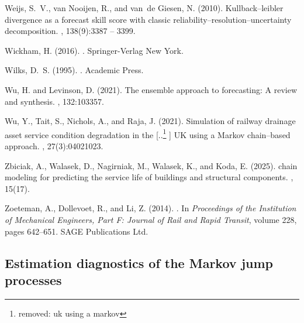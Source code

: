 \documentclass{article}
\providecommand{\DIFadd}[1]{{\protect\color{blue} \sf #1}} %
\providecommand{\DIFdel}[1]{{\protect\color{red} [..\footnote{removed: #1} ]}} %
\providecommand{\DIFaddbegin}{} %
\providecommand{\DIFaddend}{} %
\providecommand{\DIFdelbegin}{} %
\providecommand{\DIFdelend}{} %
\providecommand{\DIFaddFL}[1]{\DIFadd{#1}} %
\begin{document}
\begin{thebibliography}{}
Weijs, S.~V., van Nooijen, R., and van~de Giesen, N. (2010).
\newblock Kullback–leibler divergence as a forecast skill score with classic
  reliability–resolution–uncertainty decomposition.
, 138(9):3387 -- 3399.

Wickham, H. (2016).
.
\newblock Springer-Verlag New York.

Wilks, D.~S. (1995).
.
\newblock Academic Press.

Wu, H. and Levinson, D. (2021).
\newblock The ensemble approach to forecasting: A review and synthesis.
,
  132:103357.

Wu, Y., Tait, S., Nichols, A., and Raja, J. (2021).
\newblock Simulation of railway drainage asset service condition degradation in
  the \DIFdelbegin \DIFdel{uk using a markov }\DIFdelend \DIFaddbegin {\DIFadd{UK}} \DIFadd{using a }{\DIFadd{Markov}} \DIFaddend chain–based approach.
, 27(3):04021023.

Zbiciak, A., Walasek, D., Nagirniak, M., Walasek, K., and Koda, E. (2025).
\newblock \DIFdelbegin \DIFdel{Markov }\DIFdelend \DIFaddbegin {\DIFadd{Markov}} \DIFaddend chain modeling for predicting the service life of buildings
  and structural components.
, 15(17).

Zoeteman, A., Dollevoet, R., and Li, Z. (2014).
.
\newblock In {\em Proceedings of the Institution of Mechanical Engineers, Part
  F: Journal of Rail and Rapid Transit}, volume 228, pages 642--651. SAGE
  Publications Ltd.

\end{thebibliography}
\DIFaddbegin 

\newpage
\appendix


\clearpage
\begin{landscape}

\section{\DIFadd{Estimation diagnostics of the Markov jump processes}}
\label{sec:diagnostics_estimation}

\begin{table}[h!]
\centering
\caption{\DIFaddFL{Akaike information criterion (AIC; computed from the log-likelihood at the score-optimal parameters) and per-observation gradient norm of the score objective.}}
\label{tab:AIC_tab}
\scriptsize

\end{table}

\end{landscape}
\clearpage
\end{document}
